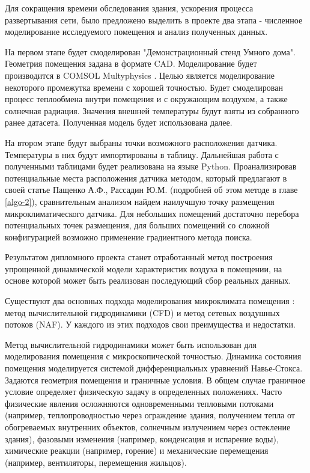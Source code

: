 Для сокращения времени обследования здания, ускорения процесса развертывания сети, было предложено выделить в проекте два этапа - численное моделирование исследуемого помещения и анализ полученных данных.

На первом этапе будет смоделирован "Демонстрационный стенд Умного дома". Геометрия помещения задана в формате CAD. Моделирование будет производится в COMSOL Multyphysics \cite{comsol}. Целью является моделирование некоторого промежутка времени с хорошей точностью. Будет смоделирован процесс теплообмена внутри помещения и с окружающим воздухом, а также солнечная радиация. Значения внешней температуры будут взяты из собранного ранее датасета. Полученная модель будет использована далее.

На втором этапе будут выбраны точки возможного расположения датчика. Температуры в них будут импортированы в таблицу. Дальнейшая работа с полученными таблицами будет реализована на языке Python. Проанализировав потенциальные места расположения датчика методом, который предлагают в своей статье Пащенко А.Ф., Рассадин Ю.М. \cite{pashchenko-rassadin} (подробней об этом методе в главе \ref{algo-2}), сравнительным анализом найдем наилучшую точку размещения микроклиматического датчика. Для небольших помещений достаточно перебора потенциальных точек размещения, для больших помещений со сложной конфигурацией возможно применение градиентного метода поиска.


Результатом дипломного проекта станет отработанный метод построения упрощенной динамической модели характеристик воздуха в помещении, на основе которой может быть реализован последующий сбор реальных данных.

\newpage


Существуют два основных подхода моделирования микроклимата помещения \cite{ashrae}: метод вычислительной гидродинамики (CFD) и метод сетевых воздушных потоков (NAF). У каждого из этих подходов свои преимущества и недостатки.

Метод вычислительной гидродинамики может быть использован для моделирования помещения с микроскопической точностью. Динамика состояния помещения моделируется системой дифференциальных уравнений Навье-Стокса. Задаются геометрия помещения и граничные условия. В общем случае граничное условие определяет физическую задачу в определенных положениях. Часто физические явления осложняются одновременными тепловыми потоками (например, теплопроводностью через ограждение здания, получением тепла от обогреваемых внутренних объектов, солнечным излучением через остекление здания), фазовыми изменения (например, конденсация и испарение воды), химические реакции (например, горение) и механические перемещения (например, вентиляторы, перемещения жильцов).

